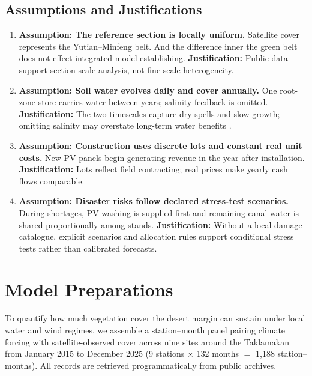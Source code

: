 \documentclass{mcmthesis}
\begin{document}
\subsection{Assumptions and Justifications}
\begingroup
\setlength{\topsep}{0pt}
\setlength{\partopsep}{0pt}
\setlength{\parsep}{0pt}
\setlength{\itemsep}{4pt}
\begin{enumerate}
  \item \textbf{Assumption: The reference section is locally uniform.} Satellite cover represents the Yutian--Minfeng belt. And the difference inner the green belt does not effect integrated model establishing.
  \newline \textbf{Justification:} Public data support section-scale analysis, not fine-scale heterogeneity.

  \item \textbf{Assumption: Soil water evolves daily and cover annually.} One root-zone store carries water between years; salinity feedback is omitted.
  \newline \textbf{Justification:} The two timescales capture dry spells and slow growth; omitting salinity may overstate long-term water benefits \cite{REF01,REF04}.

  \item \textbf{Assumption: Construction uses discrete lots and constant real unit costs.} New PV panels begin generating revenue in the year after installation.
  \newline \textbf{Justification:} Lots reflect field contracting; real prices make yearly cash flows comparable.

  \item \textbf{Assumption: Disaster risks follow declared stress-test scenarios.} During shortages, PV washing is supplied first and remaining canal water is shared proportionally among stands.
  \newline \textbf{Justification:} Without a local damage catalogue, explicit scenarios and allocation rules support conditional stress tests rather than calibrated forecasts.
\end{enumerate}
\endgroup

\clearpage
\section{Model Preparations}\label{sec:data}
To quantify how much vegetation cover the desert margin can sustain under local water and wind regimes, we assemble a station--month panel pairing climate forcing with satellite-observed cover across nine sites around the Taklamakan from January 2015 to December 2025 (9 stations $\times$ 132 months $=$ 1,188 station--months). All records are retrieved programmatically from public archives.
\end{document}
